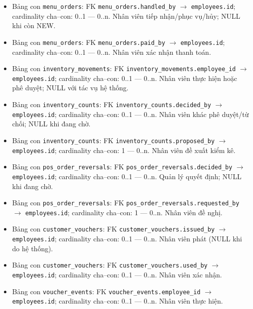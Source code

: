 \begin{itemize}
\item Bảng con \texttt{menu\_orders}: FK \texttt{menu\_orders.handled\_by} $\rightarrow$ \texttt{employees.id}; cardinality cha--con: 0..1 — 0..n. Nhân viên tiếp nhận/phục vụ/hủy; NULL khi còn NEW.

\item Bảng con \texttt{menu\_orders}: FK \texttt{menu\_orders.paid\_by} $\rightarrow$ \texttt{employees.id}; cardinality cha--con: 0..1 — 0..n. Nhân viên xác nhận thanh toán.

\item Bảng con \texttt{inventory\_movements}: FK \texttt{inventory\_movements.employee\_id} $\rightarrow$ \texttt{employees.id}; cardinality cha--con: 0..1 — 0..n. Nhân viên thực hiện hoặc phê duyệt; NULL với tác vụ hệ thống.

\item Bảng con \texttt{inventory\_counts}: FK \texttt{inventory\_counts.decided\_by} $\rightarrow$ \texttt{employees.id}; cardinality cha--con: 0..1 — 0..n. Nhân viên khác phê duyệt/từ chối; NULL khi đang chờ.

\item Bảng con \texttt{inventory\_counts}: FK \texttt{inventory\_counts.proposed\_by} $\rightarrow$ \texttt{employees.id}; cardinality cha--con: 1 — 0..n. Nhân viên đề xuất kiểm kê.

\item Bảng con \texttt{pos\_order\_reversals}: FK \texttt{pos\_order\_reversals.decided\_by} $\rightarrow$ \texttt{employees.id}; cardinality cha--con: 0..1 — 0..n. Quản lý quyết định; NULL khi đang chờ.

\item Bảng con \texttt{pos\_order\_reversals}: FK \texttt{pos\_order\_reversals.requested\_by} $\rightarrow$ \texttt{employees.id}; cardinality cha--con: 1 — 0..n. Nhân viên đề nghị.

\item Bảng con \texttt{customer\_vouchers}: FK \texttt{customer\_vouchers.issued\_by} $\rightarrow$ \texttt{employees.id}; cardinality cha--con: 0..1 — 0..n. Nhân viên phát (NULL khi do hệ thống).

\item Bảng con \texttt{customer\_vouchers}: FK \texttt{customer\_vouchers.used\_by} $\rightarrow$ \texttt{employees.id}; cardinality cha--con: 0..1 — 0..n. Nhân viên xác nhận.

\item Bảng con \texttt{voucher\_events}: FK \texttt{voucher\_events.employee\_id} $\rightarrow$ \texttt{employees.id}; cardinality cha--con: 0..1 — 0..n. Nhân viên thực hiện.


\end{itemize}
